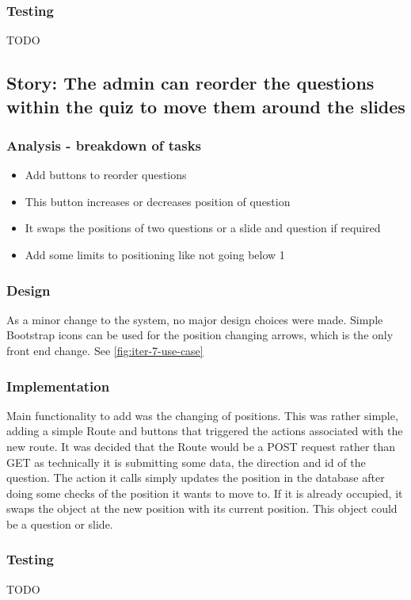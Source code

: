 \subsubsection{Testing}
TODO
\newpage

\subsection{Story: The admin can reorder the questions within the quiz to move them around the slides}
\subsubsection{Analysis - breakdown of tasks}
\begin{itemize}
	\item Add buttons to reorder questions
	\item This button increases or decreases position of question
	\item It swaps the positions of two questions or a slide and question if required
	\item Add some limits to positioning like not going below 1
\end{itemize}
\subsubsection{Design}
As a minor change to the system, no major design choices were made. Simple Bootstrap icons can be used for the position changing arrows, which is the only front end change.
See \ref{fig:iter-7-use-case} 
\subsubsection{Implementation}
Main functionality to add was the changing of positions. This was rather simple, adding a simple Route and buttons that triggered the actions associated with the new route. It was decided that the Route would be a POST request rather than GET as technically it is submitting some data, the direction and id of the question. The action it calls simply updates the position in the database after doing some checks of the position it wants to move to. If it is already occupied, it swaps the object at the new position with its current position. This object could be a question or slide.   
\subsubsection{Testing}
TODO
\newpage

